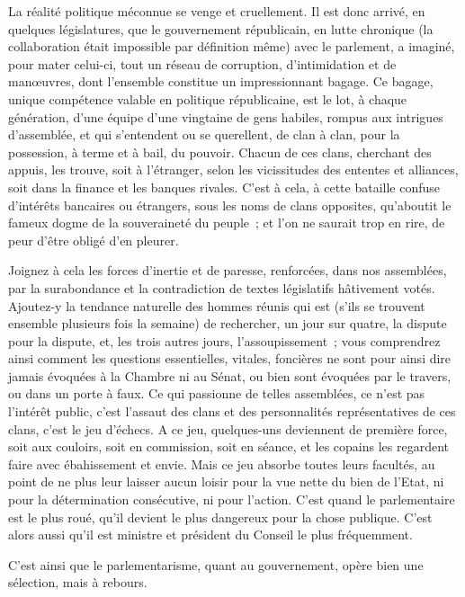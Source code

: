 \documentclass[french,twoside]{book} %
\begin{document}
La réalité politique méconnue se venge et cruellement. Il est donc arrivé, en quelques législatures, que le gouvernement républicain, en lutte chronique (la collaboration était impossible par définition même) avec le parlement, a imaginé, pour mater celui-ci, tout un réseau de corruption, d’intimidation et de manœuvres, dont l’ensemble constitue un impressionnant bagage. Ce bagage, unique compétence valable en politique républicaine, est le lot, à chaque génération, d’une équipe d’une vingtaine de gens habiles, rompus aux intrigues d’assemblée, et qui s’entendent ou se querellent, de clan à clan, pour la possession, à terme et à bail, du pouvoir. Chacun de ces clans, cherchant des appuis, les trouve, soit à l’étranger, selon les vicissitudes des ententes et alliances, soit dans la finance et les banques rivales. C’est à cela, à cette bataille confuse d’intérêts bancaires ou étrangers, sous les noms de clans opposites, qu’aboutit le fameux dogme de la souveraineté du peuple ; et l’on ne saurait trop en rire, de peur d’être obligé d’en pleurer.\par
Joignez à cela les forces d’inertie et de paresse, renforcées, dans nos assemblées, par la surabondance et la contradiction de textes législatifs hâtivement votés. Ajoutez-y la tendance naturelle des hommes réunis qui est (s’ils se trouvent ensemble plusieurs fois la semaine) de rechercher, un jour sur quatre, la dispute pour la dispute, et, les trois autres jours, l’assoupissement ; vous comprendrez ainsi comment les questions essentielles, vitales, foncières ne sont pour ainsi dire jamais évoquées à la Chambre ni au Sénat, ou bien sont évoquées par le travers, ou dans un porte à faux. Ce qui passionne de telles assemblées, ce n’est pas l’intérêt public, c’est l’assaut des clans et des personnalités représentatives de ces clans, c’est le jeu d’échecs. A ce jeu, quelques-uns deviennent de première force, soit aux couloirs, soit en commission, soit en séance, et les copains les regardent faire avec ébahissement et envie. Mais ce jeu absorbe toutes leurs facultés, au point de ne plus leur laisser aucun loisir pour la vue nette du bien de l’Etat, ni pour la détermination consécutive, ni pour l’action. C’est quand le parlementaire est le plus roué, qu’il devient le plus dangereux pour la chose publique. C’est alors aussi qu’il est ministre et président du Conseil le plus fréquemment.\par
C’est ainsi que le parlementarisme, quant au gouvernement, opère bien une sélection, mais à rebours.\par
\end{document}
